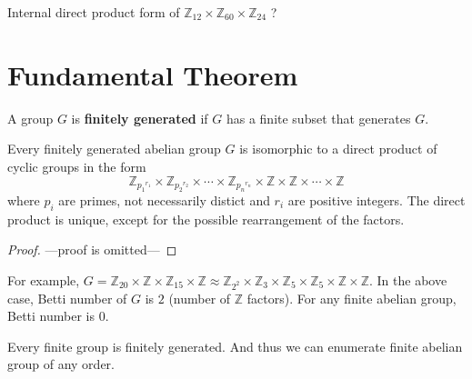 \begin{question}
	Internal direct product form of $\mathbb{Z}_{12} \times \mathbb{Z}_{60} \times \mathbb{Z}_{24}$ ?
\end{question}

\section{Fundamental Theorem}
\begin{definition}
	A group $G$ is \textbf{finitely generated} if $G$ has a finite subset that generates $G$.
\end{definition}

\begin{theorem}
	Every finitely generated abelian group $G$ is isomorphic to a direct product of cyclic groups in the form
	$$\mathbb{Z}_{{p_1}^{r_1}} \times\mathbb{Z}_{{p_2}^{r_2}} \times \cdots \times \mathbb{Z}_{{p_n}^{r_n}} \times \mathbb{Z} \times \mathbb{Z} \times \cdots \times \mathbb{Z}$$
	where $p_i$ are primes, not necessarily distict and $r_i$ are positive integers.
	The direct product is unique, except for the possible rearrangement of the factors.
\end{theorem}
\begin{proof}
	---proof is omitted---
\end{proof}

For example, $ G = \mathbb{Z}_{20} \times \mathbb{Z} \times \mathbb{Z}_{15} \times \mathbb{Z} \approx \mathbb{Z}_{2^2} \times \mathbb{Z}_3 \times \mathbb{Z}_5 \times \mathbb{Z}_5 \times \mathbb{Z} \times \mathbb{Z}$.
In the above case, Betti number of $G$ is $2$ (number of $\mathbb{Z}$ factors).
For any finite abelian group, Betti number is $0$.

\begin{remark}
	Every finite group is finitely generated.
	And thus we can enumerate finite abelian group of any order.
\end{remark}

